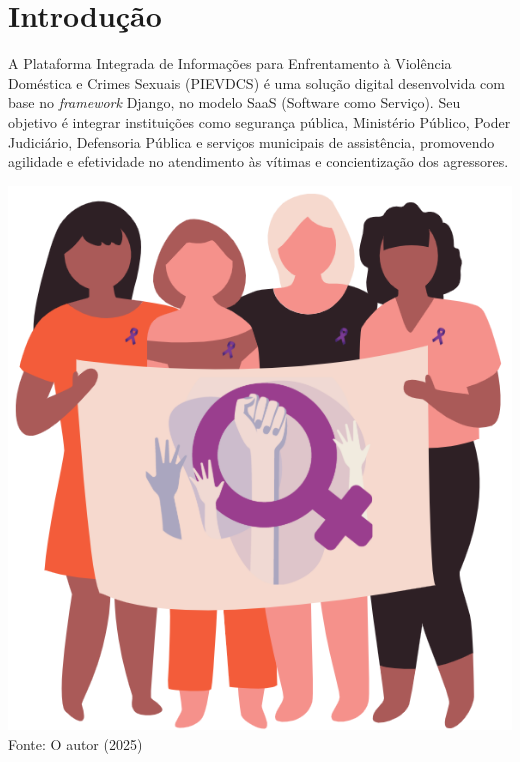 
%
%
%
\section{Introdução}

\noindent \begin{minipage}[c]{0.6\textwidth}
  \vspace {1cm}
  A Plataforma Integrada de Informações para Enfrentamento à Violência Doméstica e Crimes Sexuais (PIEVDCS) é uma solução digital desenvolvida com base no \textit{framework} Django, no modelo SaaS (Software como Serviço). Seu objetivo é integrar instituições como segurança pública, Ministério Público, Poder Judiciário, Defensoria Pública e serviços municipais de assistência, promovendo agilidade e efetividade no atendimento às vítimas e concientização dos agressores.

  
\end{minipage}
\begin{minipage}[c]{0.4\textwidth}
  \includegraphics[width=\textwidth]{figure/logo_PIEVDCS.png}
  \label{figlogo_PIEVDCS}
  {\fontsize{10pt}{\baselineskip}\selectfont
    Fonte: O autor (2025)}
\end{minipage}
\\
